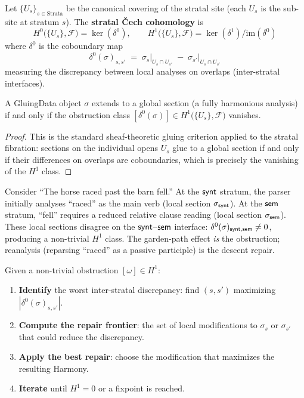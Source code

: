 \begin{definition}
\label{def:stratal-cech}
Let $\{U_s\}_{s \in \mathrm{Strata}}$ be the canonical covering of
the stratal site (each $U_s$ is the sub-site at stratum $s$).  The
\textbf{stratal \v{C}ech cohomology} is
\[
  H^0\bigl(\{U_s\}, \mathcal{F}\bigr) =
  \ker(\delta^0),
  \qquad
  H^1\bigl(\{U_s\}, \mathcal{F}\bigr) =
  \ker(\delta^1) / \mathrm{im}(\delta^0)
\]
where $\delta^0$ is the coboundary map
\[
  \delta^0(\sigma)_{s,s'} \;=\;
  \sigma_s\big|_{U_s \cap U_{s'}}
  \;-\; \sigma_{s'}\big|_{U_s \cap U_{s'}}
\]
measuring the discrepancy between local analyses on overlaps
(inter-stratal interfaces).
\end{definition}

\begin{theorem}
\label{thm:obstructions}
A GluingData object $\sigma$ extends to a global section (a fully
harmonious analysis) if and only if the obstruction class
$[\delta^0(\sigma)] \in H^1\bigl(\{U_s\}, \mathcal{F}\bigr)$
vanishes.
\end{theorem}

\begin{proof}
This is the standard sheaf-theoretic gluing criterion applied to the
stratal fibration: sections on the individual opens $U_s$ glue to a
global section if and only if their differences on overlaps are
coboundaries, which is precisely the vanishing of the $H^1$ class.
\end{proof}

\begin{example}
\label{ex:garden-path}
Consider ``The horse raced past the barn fell.''  At the $\mathsf{synt}$
stratum, the parser initially analyses ``raced'' as the main verb
(local section $\sigma_{\mathsf{synt}}$).  At the $\mathsf{sem}$ stratum, ``fell''
requires a reduced relative clause reading (local section
$\sigma_{\mathsf{sem}}$).  These local sections disagree on the $\mathsf{synt}$--$\mathsf{sem}$
interface: $\delta^0(\sigma)_{\mathsf{synt},\mathsf{sem}} \neq 0$, producing a
non-trivial $H^1$ class.  The garden-path effect \emph{is} the
obstruction; reanalysis (reparsing ``raced'' as a passive participle)
is the descent repair.
\end{example}

\begin{construction}
\label{con:descent-repair}
Given a non-trivial obstruction $[\omega] \in H^1$:
\begin{enumerate}[label=\textbf{Step \arabic*:}]
\item \textbf{Identify} the worst inter-stratal discrepancy:
  find $(s, s')$ maximizing $|\delta^0(\sigma)_{s,s'}|$.
\item \textbf{Compute the repair frontier}: the set of local
  modifications to $\sigma_s$ or $\sigma_{s'}$ that could reduce
  the discrepancy.
\item \textbf{Apply the best repair}: choose the modification that
  maximizes the resulting Harmony.
\item \textbf{Iterate} until $H^1 = 0$ or a fixpoint is reached.
\end{enumerate}
\end{construction}

